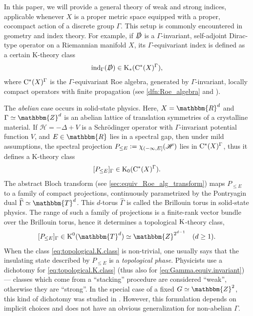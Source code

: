 \documentclass{amsart}
\numberwithin{figure}{section}
\numberwithin{equation}{section}
\numberwithin{table}{section}
\theoremstyle{plain}
\theoremstyle{definition}
\theoremstyle{remark}
\theoremstyle{nonumber}
\newcommand{\Z}{\mathbb{Z}}
\newcommand{\R}{\mathbb{R}}
\newcommand{\T}{\mathbb{T}}
\newcommand{\K}{\relax\ifmmode\operatorname{K}\else\textup{K}\fi}
\newcommand{\Cst}{\relax\ifmmode\mathrm{C}^*\else\textup{C*}\fi}
\newcommand{\defeq}{\mathrel{\vcentcolon=}}
\renewcommand{\mathbb}{\mathbbm} %
\begin{document}
In this paper, we will provide a general theory of weak and strong indices,
applicable whenever
$X$ is a proper metric space equipped with a proper, cocompact action
of a discrete group \( \Gamma \). 
This setup is commonly encountered in geometry and index theory.
For example, if $\slashed{D}$ is a $\Gamma$-invariant, self-adjoint
Dirac-type operator on a Riemannian manifold $X$,
its \( \Gamma \)-equivariant index is defined as a certain K-theory class
\begin{equation}\label{eq:Dirac.index}
\mathrm{ind}_{\Gamma}(\slashed{D})\in \K_*(\Cst(X)^\Gamma),
\end{equation}
where $\Cst(X)^\Gamma$ is the \( \Gamma \)-equivariant Roe algebra, 
generated by
$\Gamma$-invariant, locally compact operators with finite propagation (see
\cref{dfn:Roe_algebra} and \cite{Roe:Index_theory_coarse_geometry}).

The \emph{abelian} case occurs in solid-state physics. Here, $X=\R^d$ and
$\Gamma\simeq\Z^d$ is an abelian lattice of translation symmetries of
a crystalline material. If $\mathscr{H}=-\Delta+V$ is a Schr\"{o}dinger operator with
$\Gamma$-invariant potential function $V$, and $E\in\R$ lies in a spectral
gap, then under mild assumptions, the spectral projection
$P_{\leq E}\defeq \chi_{(-\infty,E]}(\mathscr{H})$
lies in $\Cst(X)^\Gamma$, thus it defines a
K-theory class
\begin{equation}\label{eq:Gamma.equiv.invariant}
[P_{\leq E}]_\Gamma\in \K_0(\Cst(X)^{\Gamma}).
\end{equation}
The abstract Bloch transform 
(see \cref{sec:equiv_Roe_alg_transform}) maps
$P_{\leq E}$ to a family of compact projections, continuously
parametrized by the Pontryagin dual $\widehat{\Gamma}\simeq\T^d$.
This \( d \)-torus \( \widehat{\Gamma} \) is called the Brillouin
torus in solid-state physics.
The range of such a family of projections is a finite-rank vector
bundle over the Brillouin torus, hence it determines a topological
$\K$-theory class,
\begin{equation}\label{eq:topological.K.class}
[P_{\leq E}]_\Gamma\in \K^0(\T^d)\simeq \Z^{2^{d-1}}\quad (d\geq
1).
\end{equation}
When the class \eqref{eq:topological.K.class} is non-trivial, one usually
says that the insulating state described by $P_{\leq E}$ is a
\emph{topological phase}. Physicists use a dichotomy for
\eqref{eq:topological.K.class} (thus also for
\eqref{eq:Gamma.equiv.invariant}) --- classes which come from a
``stacking'' procedure are considered ``weak'', otherwise they are
``strong''. In the special case of a fixed
$G\simeq \Z^2$, this kind of dichotomy was studied in
\cites{Fu-Kane-Mele:TI_in_3D, Moore-Balents:Topological_invariants_TRS,
Ewert-Meyer:Coarse_geometry,
Prodan-SBaldes:Complex_topological_insulators}. However, this formulation depends on implicit choices and does not have an obvious generalization for non-abelian $\Gamma$.
\end{document}
